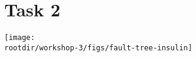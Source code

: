 \documentclass{article}
\def\rootdir{../}
\begin{document}
%


\section*{Task 2}

\texttt{[image: \\rootdir/workshop-3/figs/fault-tree-insulin]}
\end{document}
